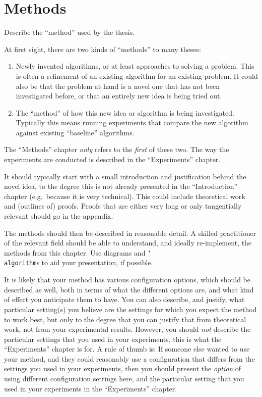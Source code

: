 \chapter{Methods}\label{chap:methods}

Describe the ``method'' used by the thesis.

At first sight, there are two kinds of ``methods'' to many theses:
\begin{enumerate}
    \item Newly invented algorithms, or at least approaches to solving a problem.
    This is often a refinement of an existing algorithm for an existing problem.
    It could also be that the problem at hand is a novel one that has not been investigated before, or that an entirely new idea is being tried out.
    \item The ``method'' of how this new idea or algorithm is being investigated.
    Typically this means running experiments that compare the new algorithm against existing ``baseline'' algorithms.
\end{enumerate}

The ``Methods'' chapter \emph{only} refers to the \emph{first} of these two.
The way the experiments are conducted is described in the ``Experiments'' chapter.

It should typically start with a small introduction and justification behind the novel idea, to the degree this is not already presented in the ``Introduction'' chapter (e.g.\ because it is very technical).
This could include theoretical work and (outlines of) proofs.
Proofs that are either very long or only tangentially relevant should go in the appendix.

The methods should then be described in reasonable detail.
A skilled practitioner of the relevant field should be able to understand, and ideally re-implement, the methods from this chapter.
Use diagrams and \texttt{\char`\\algorithm}s to aid your presentation, if possible.

It is likely that your method has various configuration options, which should be described as well, both in terms of what the different options are, and what kind of effect you anticipate them to have.
You can also describe, and justify, what particular setting(s) you believe are the settings for which you expect the method to work best, but only to the degree that you can justify that from theoretical work, not from your experimental results.
However, you should \emph{not} describe the particular settings that you used in your experiments, this is what the ``Experiments'' chapter is for.
A rule of thumb is:
If someone else wanted to use your method, and they could reasonably use a configuration that  differs from the settings you used in your experiments, then you should present the \emph{option} of using different configuration settings here, and the particular setting that you used in your experiments in the ``Experiments'' chapter.

